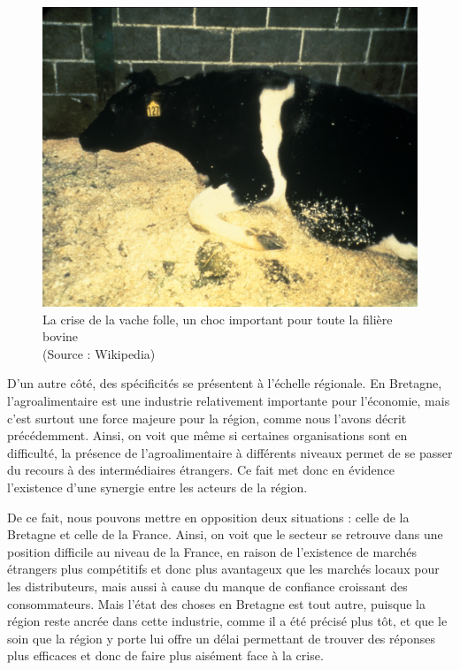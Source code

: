 \documentclass[a4paper,12pt]{report}
\begin{document}
			\begin{figure}[!h]
			\centering
			\includegraphics[scale=0.5]{Illustrations/VacheFolle.jpg}
			\caption{La crise de la vache folle, un choc important pour toute la filière bovine\\(Source : Wikipedia)}
			\label{VacheFolle}
			\end{figure}
			
			D’un autre côté, des spécificités se présentent à l’échelle régionale. En Bretagne, l’agroalimentaire est une industrie relativement importante pour l’économie, mais c’est surtout une force majeure pour la région, comme nous l'avons décrit précédemment. Ainsi, on voit que même si certaines organisations sont en difficulté, la présence de l’agroalimentaire à différents niveaux permet de se passer du recours à des intermédiaires étrangers. Ce fait met donc en évidence l’existence d’une synergie entre les acteurs de la région.

			De ce fait, nous pouvons mettre en opposition deux situations : celle de la Bretagne et celle de la France. Ainsi, on voit que le secteur se retrouve dans une position difficile au niveau de la France, en raison de l’existence de marchés étrangers plus compétitifs et donc plus avantageux que les marchés locaux pour les distributeurs, mais aussi à cause du manque de confiance croissant des consommateurs. Mais l’état des choses en Bretagne est tout autre, puisque la région reste ancrée dans cette industrie, comme il a été précisé plus tôt, et que le soin que la région y porte lui offre un délai permettant de trouver des réponses plus efficaces et donc de faire plus aisément face à la crise.
\end{document}
